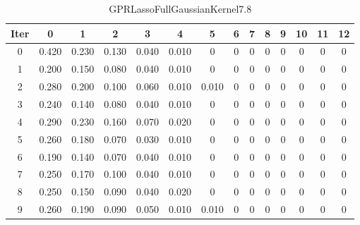 \begin{table}
	\begin{center}
		\begin{tabular}{|c|c|c|c|c|c|c|c|c|c|c|c|c|c|}
			\hline
			Iter & 0 & 1 & 2 & 3 & 4 & 5 & 6 & 7 & 8 & 9 & 10 & 11 & 12 \\
			\hline
			0 & 0.420 & 0.230 & 0.130 & 0.040 & 0.010 & 0 & 0 & 0 & 0 & 0 & 0 & 0 & 0 \\
			\hline
			1 & 0.200 & 0.150 & 0.080 & 0.040 & 0.010 & 0 & 0 & 0 & 0 & 0 & 0 & 0 & 0 \\
			\hline
			2 & 0.280 & 0.200 & 0.100 & 0.060 & 0.010 & 0.010 & 0 & 0 & 0 & 0 & 0 & 0 & 0 \\
			\hline
			3 & 0.240 & 0.140 & 0.080 & 0.040 & 0.010 & 0 & 0 & 0 & 0 & 0 & 0 & 0 & 0 \\
			\hline
			4 & 0.290 & 0.230 & 0.160 & 0.070 & 0.020 & 0 & 0 & 0 & 0 & 0 & 0 & 0 & 0 \\
			\hline
			5 & 0.260 & 0.180 & 0.070 & 0.030 & 0.010 & 0 & 0 & 0 & 0 & 0 & 0 & 0 & 0 \\
			\hline
			6 & 0.190 & 0.140 & 0.070 & 0.040 & 0.010 & 0 & 0 & 0 & 0 & 0 & 0 & 0 & 0 \\
			\hline
			7 & 0.250 & 0.170 & 0.100 & 0.040 & 0.010 & 0 & 0 & 0 & 0 & 0 & 0 & 0 & 0 \\
			\hline
			8 & 0.250 & 0.150 & 0.090 & 0.040 & 0.020 & 0 & 0 & 0 & 0 & 0 & 0 & 0 & 0 \\
			\hline
			9 & 0.260 & 0.190 & 0.090 & 0.050 & 0.010 & 0.010 & 0 & 0 & 0 & 0 & 0 & 0 & 0 \\
			\hline
		\end{tabular}
	\end{center}
	\caption{GPRLassoFullGaussianKernel7.8}
\end{table}